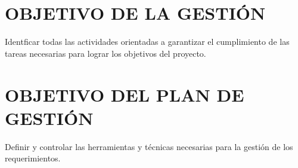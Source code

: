 \chapter{OBJETIVO DE LA GESTI\'ON}
Identficar todas las actividades orientadas a garantizar el cumplimiento de 
las tareas necesarias para lograr los objetivos del proyecto.%

\chapter{OBJETIVO DEL PLAN DE GESTI\'ON}
Definir y controlar las herramientas y t\'ecnicas necesarias para la gesti\'on de los requerimientos.%
